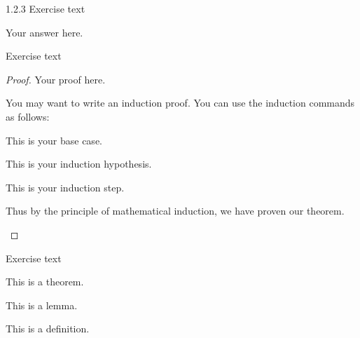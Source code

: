 \documentclass{rutgers_hw}
\author{Firstname Lastname} %
\date{\today} %
\begin{document}
\maketitle



\begin{exern}{1.2.3} %
  Exercise text
\end{exern}
\begin{solution} %
  Your answer here.
\end{solution}

\begin{exer} %
  Exercise text
\end{exer}
\begin{proof} %
  Your proof here. \par

  You may want to write an induction proof. You can use the induction commands as follows:
  \begin{induction}
    \begin{basecase}
      This is your base case.
    \end{basecase}
    \begin{indhyp}
      This is your induction hypothesis.
    \end{indhyp}
    \begin{indstep}
      This is your induction step.
    \end{indstep}
    Thus by the principle of mathematical induction, we have proven our theorem. \qedhere %
  \end{induction}
\end{proof}

\begin{exeru} %
  Exercise text
\end{exeru}

\begin{thm} %
  This is a theorem.
\end{thm}

\begin{lem} %
  This is a lemma.
\end{lem}

\begin{defn} %
  This is a definition.
\end{defn}
\end{document}
